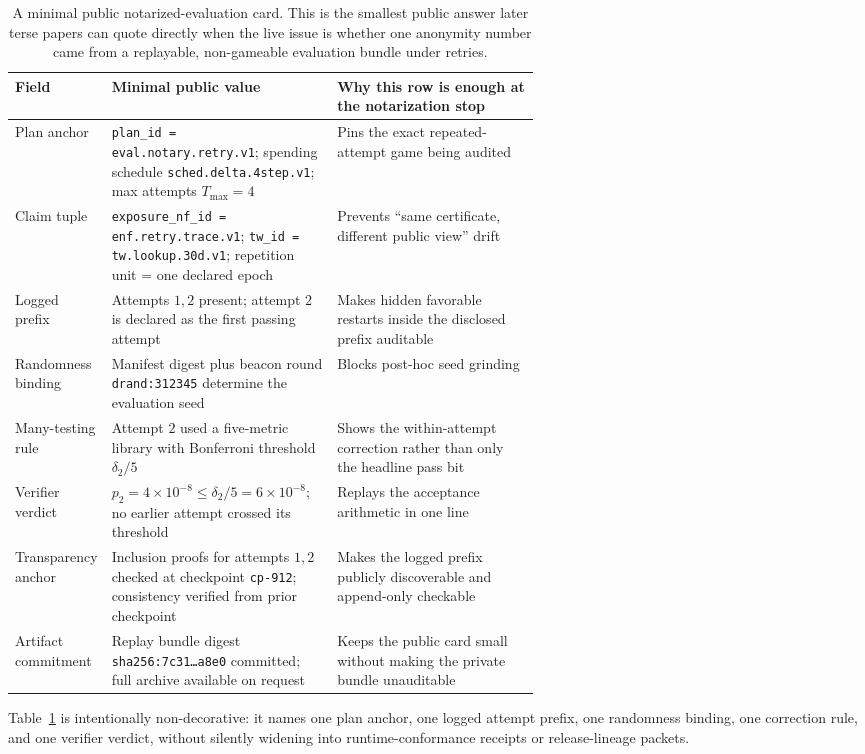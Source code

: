 \documentclass[11pt]{article}
\begin{document}
\begin{table}[t]
\centering
\small
\begin{tabularx}{0.97\linewidth}{@{}p{0.18\linewidth}p{0.43\linewidth}X@{}}
\toprule
\textbf{Field} & \textbf{Minimal public value} & \textbf{Why this row is enough at the notarization stop} \\
\midrule
Plan anchor & \texttt{plan\_id = eval.notary.retry.v1}; spending schedule \texttt{sched.delta.4step.v1}; max attempts $T_{\max}=4$ & Pins the exact repeated-attempt game being audited \\
Claim tuple & \texttt{exposure\_nf\_id = enf.retry.trace.v1}; \texttt{tw\_id = tw.lookup.30d.v1}; repetition unit = one declared epoch & Prevents ``same certificate, different public view'' drift \\
Logged prefix & Attempts $1,2$ present; attempt $2$ is declared as the first passing attempt & Makes hidden favorable restarts inside the disclosed prefix auditable \\
Randomness binding & Manifest digest plus beacon round \texttt{drand:312345} determine the evaluation seed & Blocks post-hoc seed grinding \\
Many-testing rule & Attempt $2$ used a five-metric library with Bonferroni threshold $\delta_2/5$ & Shows the within-attempt correction rather than only the headline pass bit \\
Verifier verdict & $p_2 = 4\times 10^{-8}\le \delta_2/5 = 6\times 10^{-8}$; no earlier attempt crossed its threshold & Replays the acceptance arithmetic in one line \\
Transparency anchor & Inclusion proofs for attempts $1,2$ checked at checkpoint \texttt{cp-912}; consistency verified from prior checkpoint & Makes the logged prefix publicly discoverable and append-only checkable \\
Artifact commitment & Replay bundle digest \texttt{sha256:7c31\ldots a8e0} committed; full archive available on request & Keeps the public card small without making the private bundle unauditable \\
\bottomrule
\end{tabularx}
\caption{A minimal public notarized-evaluation card. This is the smallest public answer later terse papers can quote directly when the live issue is whether one anonymity number came from a replayable, non-gameable evaluation bundle under retries.}
\label{tab:minimal-notary-card}
\end{table}

Table~\ref{tab:minimal-notary-card} is intentionally non-decorative: it names one plan anchor, one logged attempt prefix, one randomness binding, one correction rule, and one verifier verdict, without silently widening into runtime-conformance receipts or release-lineage packets.
\end{document}
